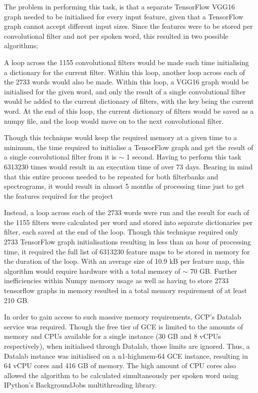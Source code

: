 The problem in performing this task, is that a separate TensorFlow VGG16 graph needed to be initialised for every input feature, given that a TensorFlow graph cannot accept different input sizes.
Since the features were to be stored per convolutional filter and not per spoken word, this resulted in two possible algorithms; 

A loop across the 1155 convolutional filters would be made each time initialising a dictionary for the current filter.
Within this loop, another loop across each of the 2733 words would also be made.
Within this loop, a VGG16 graph would be initialised for the given word, and only the result of a single convolutional filter would be added to the current dictionary of filters, with the key being the current word.
At the end of this loop, the current dictionary of filters would be saved as a numpy file, and the loop would move on to the next convolutional filter.

Though this technique would keep the required memory at a given time to a minimum, the time required to initialise a TensorFlow graph and get the result of a single convolutional filter from it is $\sim$ 1 second.
Having to perform this task 6313230 times would result in an execution time of  over 73 days.
Bearing in mind that this entire process needed to be repeated for both filterbanks and spectrograms, it would result in almost 5 months of processing time just to get the features required for the project

Instead, a loop across each of the 2733 words were run and the result for each of the 1155 filters were calculated per word and stored into separate dictionaries per filter, each saved at the end of the loop.
Though this technique required only 2733 TensorFlow graph initialisations resulting in less than an hour of processing time, it required the full list of 6313230 feature maps to be stored in memory for the duration of the loop.
With an average size of 10.9 kB per feature map, this algorithm would require hardware with a total memory of $\sim$ 70 GB.
Further inefficiencies within Numpy memory usage as well as having to store 2733 tensorflow graphs in memory resulted in a total memory requirement of at least 210 GB.

In order to gain access to such massive memory requirements, GCP's Datalab service was required.
Though the free tier of GCE is limited to the amounts of memory and CPUs available for a single instance (30 GB and 8 vCPUs respectively), when initialised through Datalab, those limits are ignored.
Thus, a Datalab instance was initialised on a n1-highmem-64 GCE instance, resulting in 64 vCPU cores and 416 GB of memory.
The high amount of CPU cores also allowed the algorithm to be calculated simultaneously per spoken word using IPython's BackgroundJobs multithreading library.

